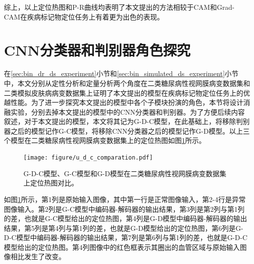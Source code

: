 综上，以上定位热图和P-R曲线均表明了本文提出的方法相较于CAM和Grad-CAM在疾病标记物定位任务上有着更为出色的表现。
\section{CNN分类器和判别器角色探究}\label{sec:g_c_g_d_g_d_c_comparsion}
在\ref{sec:bin_dr_ds_experiment}小节和\ref{sec:bin_simulated_ds_experiment}小节中，本文分别从定性分析和定量分析两个角度在二类糖尿病性视网膜病变数据集和二类模拟皮肤病病变数据集上证明了本文提出的模型在疾病标记物定位任务上的优越性能。为了进一步探究本文提出的模型中各个子模块扮演的角色，本节将设计消融实验，分别去掉本文提出的模型中的CNN分类器和判别器。为了方便后续内容叙述，对于本文提出的模型，本文将其记为G-D-C模型，在此基础上，将移除判别器之后的模型记作G-C模型，将移除CNN分类器之后的模型记作G-D模型。以上三个模型在二类糖尿病性视网膜病变数据集上的定位热图如图\ref{fig:u_d_c_comparation}所示。
\begin{figure}[h]
	\centering
	\texttt{[image: figure/u\_d\_c\_comparation.pdf]}
	\caption[G-D-C模型、G-C模型和G-D模型定位热图对比]{G-D-C模型、G-C模型和G-D模型在二类糖尿病性视网膜病变数据集上定位热图对比。} 
	\label{fig:u_d_c_comparation}
\end{figure}

如图\ref{fig:u_d_c_comparation}所示，第1列是原始输入图像，其中第一行是正常图像输入，第2-4行是异常图像输入。第2列是G-C模型中编码器-解码器的输出结果，第3列是第2列与第1列的差，也就是G-C模型给出的定位热图，第4列是G-D模型中编码器-解码器的输出结果，第5列是第4列与第1列的差，也就是G-D模型给出的定位热图，第6列是G-D-C模型中编码器-解码器的输出结果，第7列是第6列与第1列的差，也就是G-D-C模型给出的定位热图。第4列图像中的红色框表示其圈出的血管区域与原始输入图像相比发生了改变。

